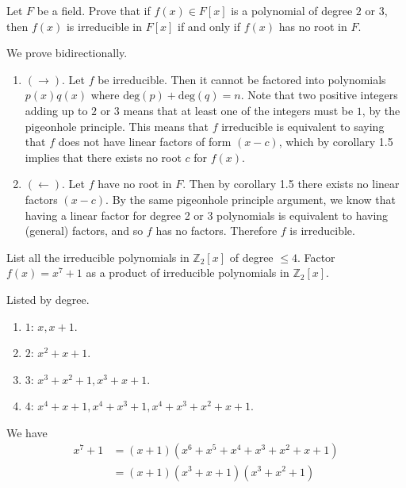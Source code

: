   \begin{exercise}[Shifrin 3.1.8]
    Let $F$ be a field. Prove that if $f(x) \in F[x]$ is a polynomial of degree $2$ or $3$, then $f(x)$ is irreducible in $F[x]$ if and only if $f(x)$ has no root in $F$.
  \end{exercise}
  \begin{solution}
    We prove bidirectionally. 
    \begin{enumerate}
      \item $(\rightarrow)$. Let $f$ be irreducible. Then it cannot be factored into polynomials $p(x) q(x)$ where $\mathrm{deg}(p) + \mathrm{deg}(q) = n$. Note that two positive integers adding up to $2$ or $3$ means that at least one of the integers must be $1$, by the pigeonhole principle. This means that $f$ irreducible is equivalent to saying that $f$ does not have linear factors of form $(x-c)$, which by corollary 1.5 implies that there exists no root $c$ for $f(x)$. 
      \item $(\leftarrow)$. Let $f$ have no root in $F$. Then by corollary 1.5 there exists no linear factors $(x-c)$. By the same pigeonhole principle argument, we know that having a linear factor for degree 2 or 3 polynomials is equivalent to having (general) factors, and so $f$ has no factors. Therefore $f$ is irreducible. 
    \end{enumerate}
  \end{solution}

  \begin{exercise}[Shifrin 3.1.13]
    List all the irreducible polynomials in $\mathbb{Z}_2[x]$ of degree $\leq 4$. Factor $f(x) = x^7 + 1$ as a product of irreducible polynomials in $\mathbb{Z}_2[x]$.
  \end{exercise}
  \begin{solution}
    Listed by degree. 
    \begin{enumerate}
      \item $1$: $x, x + 1$. 
      \item $2$: $x^2 + x + 1$. 
      \item $3$: $x^3 + x^2 + 1, x^3 + x + 1$. 
      \item $4$: $x^4 + x + 1, x^4 + x^3 + 1, x^4 + x^3 + x^2 + x + 1$. 
    \end{enumerate}
    We have 
    \begin{align}
      x^7 + 1 & = (x + 1)(x^6 + x^5 + x^4 + x^3 + x^2 + x + 1) \\
              & = (x + 1) (x^3 + x + 1) (x^3 + x^2 + 1)
    \end{align}
  \end{solution}

